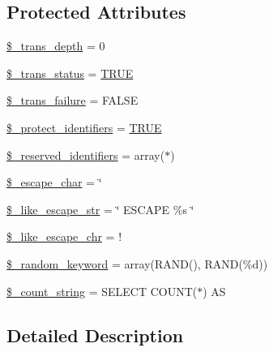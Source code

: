 \subsection*{Protected Attributes}
\begin{DoxyCompactItemize}
\item 
\mbox{\hyperlink{class_c_i___d_b__driver_a0724b7f82d62f35ef5e150146ed2a27b}{\$\+\_\+trans\+\_\+depth}} = 0
\item 
\mbox{\hyperlink{class_c_i___d_b__driver_a93acf0189d34131e156c6eb4a48c2b5b}{\$\+\_\+trans\+\_\+status}} = \mbox{\hyperlink{constants_8php_ae04a3efe6aa42044f803ee90c2277846}{T\+R\+UE}}
\item 
\mbox{\hyperlink{class_c_i___d_b__driver_afb63c722ff858ef7a4f662ec2930aad3}{\$\+\_\+trans\+\_\+failure}} = F\+A\+L\+SE
\item 
\mbox{\hyperlink{class_c_i___d_b__driver_a2e8a156a3c2abda43a4f160bcb5252e9}{\$\+\_\+protect\+\_\+identifiers}} = \mbox{\hyperlink{constants_8php_ae04a3efe6aa42044f803ee90c2277846}{T\+R\+UE}}
\item 
\mbox{\hyperlink{class_c_i___d_b__driver_aa3298c4c62fbee8bb09f1b75b633fb0d}{\$\+\_\+reserved\+\_\+identifiers}} = array(\textquotesingle{}$\ast$\textquotesingle{})
\item 
\mbox{\hyperlink{class_c_i___d_b__driver_aaec2fb0112850159063a8e47ad3aed6e}{\$\+\_\+escape\+\_\+char}} = \textquotesingle{}\char`\"{}\textquotesingle{}
\item 
\mbox{\hyperlink{class_c_i___d_b__driver_adf86ecadf3d0e1ce3f5e0eaeeb3867ae}{\$\+\_\+like\+\_\+escape\+\_\+str}} = \char`\"{} E\+S\+C\+A\+PE \textquotesingle{}\%s\textquotesingle{} \char`\"{}
\item 
\mbox{\hyperlink{class_c_i___d_b__driver_a668acfd923d0342389cd3a614628cf2a}{\$\+\_\+like\+\_\+escape\+\_\+chr}} = \textquotesingle{}!\textquotesingle{}
\item 
\mbox{\hyperlink{class_c_i___d_b__driver_a10213aa6e05f6d924d3277bb1d2fea00}{\$\+\_\+random\+\_\+keyword}} = array(\textquotesingle{}R\+A\+ND()\textquotesingle{}, \textquotesingle{}R\+A\+ND(\%d)\textquotesingle{})
\item 
\mbox{\hyperlink{class_c_i___d_b__driver_a06c80bac2ecbd0557827e96949c23097}{\$\+\_\+count\+\_\+string}} = \textquotesingle{}S\+E\+L\+E\+CT C\+O\+U\+NT($\ast$) AS \textquotesingle{}
\end{DoxyCompactItemize}


\subsection{Detailed Description}



